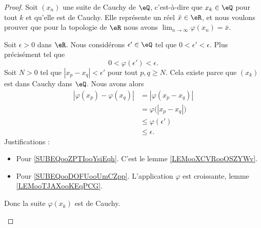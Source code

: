\begin{proof}
	Soit \( (x_n)\) une suite de Cauchy de \( \eQ\), c'est-à-dire que \( x_k\in \eQ\) pour tout \( k\) et qu'elle est de Cauchy. Elle représente un réel \( \bar x\in \eR\), et nous voulons prouver que pour la topologie de \( \eR\) nous avons \( \lim_{n\to \infty} \varphi(x_n)=\bar x\).

	\begin{subproof}

		Soit \( \epsilon>0\) dans \( \eR\). Nous considérons \( \epsilon'\in \eQ\) tel que \( 0<\epsilon'<\epsilon\). Plus précisément tel que
		\begin{equation}
			0<\varphi(\epsilon')<\epsilon.
		\end{equation}
		Soit \( N>0\) tel que \( | x_p-x_q |<\epsilon'\) pour tout \( p,q\geq N\). Cela existe parce que \( (x_k)\) est dans Cauchy dans \( \eQ\). Nous avons alors
		\begin{subequations}
			\begin{align}
				| \varphi(x_p)-\varphi(x_q) | & =| \varphi(x_p-x_q) |                                              \\
				                              & =\varphi\big( | x_p-x_q | \big)        \label{SUBEQooZPTIooYsiEqh} \\
				                              & \leq \varphi(\epsilon')            \label{SUBEQooDOFUooUmCZpp}     \\
				                              & \leq \epsilon.
			\end{align}
		\end{subequations}
		Justifications :
		\begin{itemize}
			\item Pour \eqref{SUBEQooZPTIooYsiEqh}. C'est le lemme \ref{LEMooXCVRooOSZYWv}.
			\item Pour \eqref{SUBEQooDOFUooUmCZpp}. L'application \( \varphi\) est croissante, lemme \ref{LEMooTJAXooKEqPCG}.
		\end{itemize}
		Donc la suite \(\varphi(x_k)\) est de Cauchy.


\end{subproof}
\end{proof}

